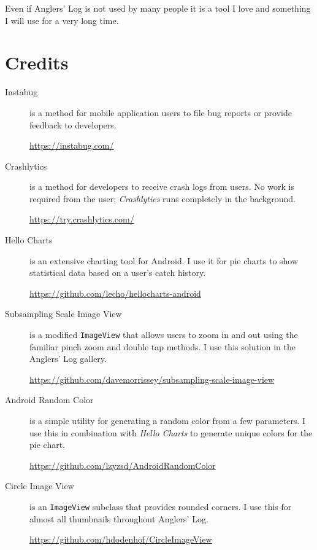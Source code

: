 \documentclass{article}
\begin{document}
	Even if Anglers' Log is not used by many people it is a tool I love and something I will use for a very long time.
	
	\newpage
	 
	 \section{Credits}
	 
	 \begin{description}
	 	\item[Instabug] is a method for mobile application users to file bug reports or provide feedback to developers.
	 	
	 	\url{https://instabug.com/} 
	 	 
	 	\item[Crashlytics] is a method for developers to receive crash logs from users.  No work is required from the user; \textit{Crashlytics} runs completely in the background.
	 	
	 	\url{https://try.crashlytics.com/}
	 	
	 	\item[Hello Charts] is an extensive charting tool for Android.  I use it for pie charts to show statistical data based on a user's catch history.
	 	
	 	\url{https://github.com/lecho/hellocharts-android}
	 	
	 	\item[Subsampling Scale Image View] is a modified \texttt{ImageView} that allows users to zoom in and out using the familiar pinch zoom and double tap methods.  I use this solution in the Anglers' Log gallery.
	 	
	 	\url{https://github.com/davemorrissey/subsampling-scale-image-view}
	 	
	 	\item[Android Random Color] is a simple utility for generating a random color from a few parameters.  I use this in combination with \textit{Hello Charts} to generate unique colors for the pie chart.
	 	
	 	\url{https://github.com/lzyzsd/AndroidRandomColor}
	 	
	 	\item[Circle Image View] is an \texttt{ImageView} subclass that provides rounded corners.  I use this for almost all thumbnails throughout Anglers' Log.
	 	
	 	\url{https://github.com/hdodenhof/CircleImageView}
	 	
	 \end{description}
	 
\end{document}
